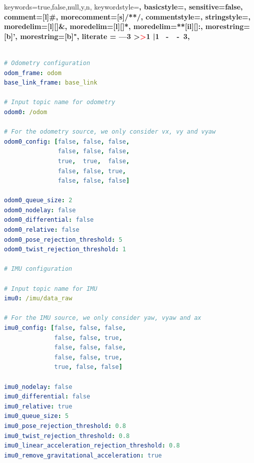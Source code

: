 \expandafter\expandafter\expandafter\lstdefinelanguage
\expandafter{\language@yaml}
{
keywords={true,false,null,y,n},
keywordstyle=\color{darkgray}\bfseries,
basicstyle=\YAMLkeystyle,                                 %
sensitive=false,
comment=[l]{\#},
morecomment=[s]{/*}{*/},
commentstyle=\color{mygreen}\ttfamily,
stringstyle=\YAMLvaluestyle\ttfamily,
moredelim=[l][\color{orange}]{\&},
moredelim=[l][\color{magenta}]{*},
moredelim=**[il][\YAMLcolonstyle{:}\YAMLvaluestyle]{:},   %
morestring=[b]',
morestring=[b]",
literate =    {---}{{\ProcessThreeDashes}}3
{>}{{\textcolor{red}\textgreater}}1
{|}{{\textcolor{red}\textbar}}1
{\ -\ }{{\mdseries\ -\ }}3,
}

\makeatother

\newcommand\ProcessThreeDashes{\llap{\color{cyan}\mdseries-{-}-}}

\begin{lstlisting}[language=yaml, label=cod:rosLocalization, caption=Interfaz de la clase STM32Hardware requerida por la biblioteca rosserial.\protect\footnotemark]

# Odometry configuration
odom_frame: odom
base_link_frame: base_link

# Input topic name for odometry
odom0: /odom

# For the odometry source, we only consider vx, vy and vyaw
odom0_config: [false, false, false,
               false, false, false,
               true,  true,  false,
               false, false, true,
               false, false, false]

odom0_queue_size: 2
odom0_nodelay: false
odom0_differential: false
odom0_relative: false
odom0_pose_rejection_threshold: 5
odom0_twist_rejection_threshold: 1

# IMU configuration

# Input topic name for IMU
imu0: /imu/data_raw

# For the IMU source, we only consider yaw, vyaw and ax
imu0_config: [false, false, false,
              false, false, true,
              false, false, false,
              false, false, true,
              true, false, false]

imu0_nodelay: false
imu0_differential: false
imu0_relative: true
imu0_queue_size: 5
imu0_pose_rejection_threshold: 0.8
imu0_twist_rejection_threshold: 0.8
imu0_linear_acceleration_rejection_threshold: 0.8
imu0_remove_gravitational_acceleration: true

\end{lstlisting}

